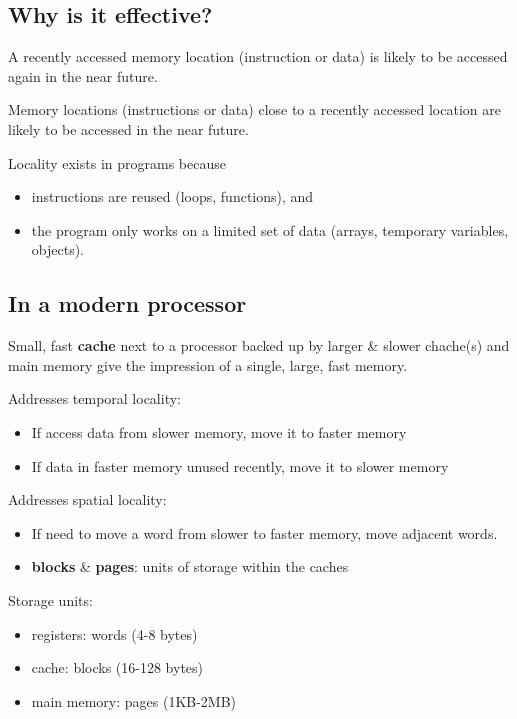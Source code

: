 \documentclass{article}
\begin{document}
\subsection{Why is it effective?}


\begin{definition}
	A recently accessed memory location (instruction or data) is likely to be accessed again in the
	near future.
\end{definition}
\begin{definition}
	Memory locations (instructions or data) close to a recently accessed location are likely to be
	accessed in the near future.
\end{definition}
\begin{theorem}
	Locality exists in programs because
	\begin{itemize}
		\item instructions are reused (loops, functions), and
		\item the program only works on a limited set of data (arrays, temporary variables, objects).
	\end{itemize}
\end{theorem}


\subsection{In a modern processor}


Small, fast \textbf{cache} next to a processor backed up by larger \& slower chache(s) and main
memory give the impression of a single, large, fast memory.

Addresses temporal locality:
\begin{itemize}
	\item If access data from slower memory, move it to faster memory
	\item If data in faster memory unused recently, move it to slower memory
\end{itemize}


\noindent Addresses spatial locality:
\begin{itemize}
	\item If need to move a word from slower to faster memory, move adjacent words.
	\item \textbf{blocks} \& \textbf{pages}: units of storage within the caches
\end{itemize}

\noindent Storage units:
\begin{itemize}
	\item registers: words (4-8 bytes)
	\item cache: blocks (16-128 bytes)
	\item main memory: pages (1KB-2MB)
\end{itemize}
\end{document}
